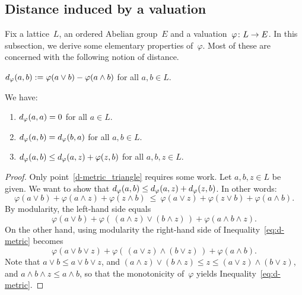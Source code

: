 \documentclass[main.tex]{subfiles}
\begin{document}
\subsection{Distance induced by a valuation}
Fix a lattice~$L$,
an ordered Abelian group~$E$
and a valuation~$\varphi\colon L\rightarrow E$.
In this subsection,
we derive some elementary properties of~$\varphi$.
Most of these are concerned with the following notion
of distance.
\begin{dfn}
\label{D:d}
\quad
$d_{\smash{\varphi}}(a,b):= \varphi(a\vee b) - \varphi(a \wedge b)$
\quad
for all $a,b\in L$.
\end{dfn}
\begin{lem}
\label{L:d-metric}
We have:
\begin{enumerate}
\item\label{d-metric_self} 
$d_{\smash{\varphi}}(a,a)=0$ for all $a\in L$.
\item\label{d-metric_sym}
$d_{\smash{\varphi}}(a,b)=d_{\smash{\varphi}}(b,a)$ for all $a,b\in L$.
\item\label{d-metric_triangle}
$d_{\smash{\varphi}}(a,b)\leq d_{\smash{\varphi}}(a,z)+\varphi(z,b)$
for all $a,b,z\in L$.
\end{enumerate}
\end{lem}
\begin{proof}
Only point~\ref{d-metric_triangle} requires some work.
Let $a,b,z\in L$ be given.
We want to show that $d_{\smash{\varphi}}(a,b) \leq d_{\smash{\varphi}}(a,z)+d_{\smash{\varphi}}(z,b)$.
In other words:
\begin{equation}
\label{eq:d-metric}
\varphi(a\vee b) + \varphi(a\wedge z) + \varphi (z\wedge b)
\ \leq\ 
\varphi (a\vee z) + \varphi(z\vee b) + \varphi (a\wedge b)\text{.}
\end{equation}
By modularity,
the left-hand side equals
\begin{equation*}
\varphi(a\vee b) 
 + \varphi(\,(a\wedge z)\vee(b\wedge z)\,)
 + \varphi(a\wedge b\wedge z).
\end{equation*}
On the other hand,
using modularity
the right-hand side of Inequality~\eqref{eq:d-metric} becomes
\begin{equation*}
\varphi(a\vee b\vee z)
 + \varphi(\,(a\vee z)\wedge(b\vee z)\,)
 + \varphi(a\wedge b).
\end{equation*}
Note that $a\vee b \leq a\vee b\vee z$,
and $(a\wedge z)\vee (b\wedge z) \leq z \leq (a\vee z)\wedge (b\vee z)$,
and $a\wedge b\wedge z \leq a\wedge b$,
so that the monotonicity of~$\varphi$ yields Inequality~\eqref{eq:d-metric}.
\end{proof}
%
\end{document}
